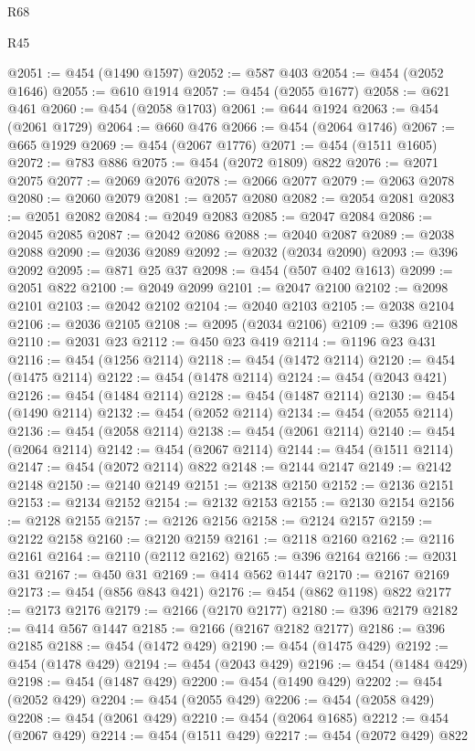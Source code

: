 \begin{lexlean}{R68}
\begin{lexlean}{R45}
\begin{coremodule}
{{{{{{{{{{{{{{{{{{{{{{{{{{{{{{{{{{{{{{{{{{{{{{{{{{{{{{{{{{{{{{{{{{{{{{{{{{{{{{{{{{{{{{{{{{{@2051 := @454 (@1490 @1597)
@2052 := @587 @403
@2054 := @454 (@2052 @1646)
@2055 := @610 @1914
@2057 := @454 (@2055 @1677)
@2058 := @621 @461
@2060 := @454 (@2058 @1703)
@2061 := @644 @1924
@2063 := @454 (@2061 @1729)
@2064 := @660 @476
@2066 := @454 (@2064 @1746)
@2067 := @665 @1929
@2069 := @454 (@2067 @1776)
@2071 := @454 (@1511 @1605)
@2072 := @783 @886
@2075 := @454 (@2072 @1809) @822
@2076 := @2071 @2075
@2077 := @2069 @2076
@2078 := @2066 @2077
@2079 := @2063 @2078
@2080 := @2060 @2079
@2081 := @2057 @2080
@2082 := @2054 @2081
@2083 := @2051 @2082
@2084 := @2049 @2083
@2085 := @2047 @2084
@2086 := @2045 @2085
@2087 := @2042 @2086
@2088 := @2040 @2087
@2089 := @2038 @2088
@2090 := @2036 @2089
@2092 := @2032 (@2034 @2090)
@2093 := @396 @2092
@2095 := @871 @25 @37
@2098 := @454 (@507 @402 @1613)
@2099 := @2051 @822
@2100 := @2049 @2099
@2101 := @2047 @2100
@2102 := @2098 @2101
@2103 := @2042 @2102
@2104 := @2040 @2103
@2105 := @2038 @2104
@2106 := @2036 @2105
@2108 := @2095 (@2034 @2106)
@2109 := @396 @2108
@2110 := @2031 @23
@2112 := @450 @23 @419
@2114 := @1196 @23 @431
@2116 := @454 (@1256 @2114)
@2118 := @454 (@1472 @2114)
@2120 := @454 (@1475 @2114)
@2122 := @454 (@1478 @2114)
@2124 := @454 (@2043 @421)
@2126 := @454 (@1484 @2114)
@2128 := @454 (@1487 @2114)
@2130 := @454 (@1490 @2114)
@2132 := @454 (@2052 @2114)
@2134 := @454 (@2055 @2114)
@2136 := @454 (@2058 @2114)
@2138 := @454 (@2061 @2114)
@2140 := @454 (@2064 @2114)
@2142 := @454 (@2067 @2114)
@2144 := @454 (@1511 @2114)
@2147 := @454 (@2072 @2114) @822
@2148 := @2144 @2147
@2149 := @2142 @2148
@2150 := @2140 @2149
@2151 := @2138 @2150
@2152 := @2136 @2151
@2153 := @2134 @2152
@2154 := @2132 @2153
@2155 := @2130 @2154
@2156 := @2128 @2155
@2157 := @2126 @2156
@2158 := @2124 @2157
@2159 := @2122 @2158
@2160 := @2120 @2159
@2161 := @2118 @2160
@2162 := @2116 @2161
@2164 := @2110 (@2112 @2162)
@2165 := @396 @2164
@2166 := @2031 @31
@2167 := @450 @31
@2169 := @414 @562 @1447
@2170 := @2167 @2169
@2173 := @454 (@856 @843 @421)
@2176 := @454 (@862 @1198) @822
@2177 := @2173 @2176
@2179 := @2166 (@2170 @2177)
@2180 := @396 @2179
@2182 := @414 @567 @1447
@2185 := @2166 (@2167 @2182 @2177)
@2186 := @396 @2185
@2188 := @454 (@1472 @429)
@2190 := @454 (@1475 @429)
@2192 := @454 (@1478 @429)
@2194 := @454 (@2043 @429)
@2196 := @454 (@1484 @429)
@2198 := @454 (@1487 @429)
@2200 := @454 (@1490 @429)
@2202 := @454 (@2052 @429)
@2204 := @454 (@2055 @429)
@2206 := @454 (@2058 @429)
@2208 := @454 (@2061 @429)
@2210 := @454 (@2064 @1685)
@2212 := @454 (@2067 @429)
@2214 := @454 (@1511 @429)
@2217 := @454 (@2072 @429) @822
}}}}}}}}}}}}}}}}}}}}}}}}}}}}}}}}}}}}}}}}}}}}}}}}}}}}}}}}}}}}}}}}}}}}}}}}}}}}}}}}}}}}}}}}}}}
\end{coremodule}
\end{lexlean}
\end{lexlean}
